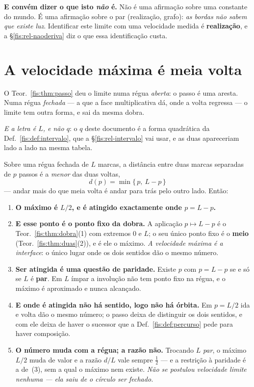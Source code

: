 \documentclass[livro.tex]{subfiles}
\begin{document}
\medskip\noindent\textbf{E convém dizer o que isto \emph{não} é.} Não é uma
afirmação sobre uma constante do mundo. É uma afirmação sobre o par (realização,
grafo): \emph{as bordas não sabem que existe luz}. Identificar este limite com
uma velocidade medida é \textbf{realização}, e a §\ref{fis:rel-naoderiva} diz o
que essa identificação custa.

\section{A velocidade máxima é meia volta}\label{fis:rel-meiavolta}

\noindent O Teor.~\ref{fis:thm:passo} deu o limite numa régua \emph{aberta}: o
passo é uma aresta. Numa régua \emph{fechada} --- a que a face multiplicativa dá,
onde a volta regressa --- o limite tem outra forma, e sai da mesma dobra.

\medskip\noindent\emph{E a letra é $L$, e não $q$}: o $q$ deste documento é a
forma quadrática da Def.~\ref{fis:def:intervalo}, que a §\ref{fis:rel-intervalo}
vai usar, e as duas apareceriam lado a lado na mesma tabela.

\begin{teorema}\label{fis:thm:meiavolta}
Sobre uma régua fechada de $L$ marcas, a distância entre duas marcas separadas de
$p$ passos é a \emph{menor} das duas voltas,
\[
\boxed{\;d(p)=\min\{\,p,\ L-p\,\}\;}
\]
--- andar mais do que meia volta é andar para trás pelo outro lado. Então:
\begin{enumerate}\itemsep3pt
\item[(1)] \textbf{O máximo é $L/2$, e é atingido exactamente onde $p=L-p$.}
\item[(2)] \textbf{E esse ponto é o ponto fixo da dobra.} A aplicação
$p\mapsto L-p$ é o Teor.~\ref{fis:thm:dobra}(1) com extremos $0$ e $L$; o seu único
ponto fixo é o \textbf{meio} (Teor.~\ref{fis:thm:duas}(2)), e é ele o máximo.
\emph{A velocidade máxima é a interface}: o único lugar onde os dois sentidos dão
o mesmo número.
\item[(3)] \textbf{Ser atingida é uma questão de paridade.} Existe $p$ com
$p=L-p$ se e só se $L$ é \textbf{par}. Em $L$ ímpar a involução não tem ponto
fixo na régua, e o máximo é aproximado e nunca alcançado.
\item[(4)] \textbf{E onde é atingida não há sentido, logo não há órbita.} Em
$p=L/2$ ida e volta dão o mesmo número; o passo deixa de distinguir os dois
sentidos, e com ele deixa de haver o sucessor que a Def.~\ref{fis:def:percurso}
pede para haver composição.
\item[(5)] \textbf{O número muda com a régua; a razão não.} Trocando $L$
\emph{par}, o máximo $L/2$ muda de valor e a razão $d/L$ vale sempre
$\tfrac12$ --- e a restrição à paridade é a de~(3), sem a qual o máximo nem
existe. \emph{Não se postulou velocidade limite nenhuma --- ela saiu de o círculo
ser fechado.}
\end{enumerate}
\end{teorema}
\end{document}
